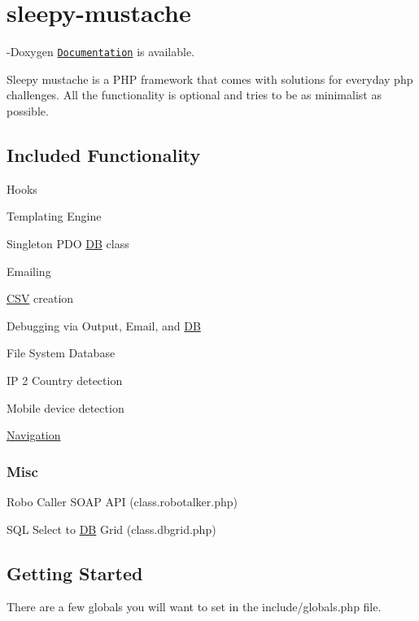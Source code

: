 \section*{sleepy-\/mustache}

-\/\-Doxygen \href{http://www.sleepymustache.com/documentation/html/index.html}{\tt Documentation} is available.

Sleepy mustache is a P\-H\-P framework that comes with solutions for everyday php challenges. All the functionality is optional and tries to be as minimalist as possible.

\subsection*{Included Functionality}


\begin{DoxyItemize}
\item Hooks
\item Templating Engine
\item Singleton P\-D\-O \hyperlink{class_d_b}{D\-B} class
\item Emailing
\item \hyperlink{class_c_s_v}{C\-S\-V} creation
\item Debugging via Output, Email, and \hyperlink{class_d_b}{D\-B}
\item File System Database
\item I\-P 2 Country detection
\item Mobile device detection
\item \hyperlink{class_navigation}{Navigation}
\end{DoxyItemize}

\subsubsection*{Misc}


\begin{DoxyItemize}
\item Robo Caller S\-O\-A\-P A\-P\-I (class.\-robotalker.\-php)
\item S\-Q\-L Select to \hyperlink{class_d_b}{D\-B} Grid (class.\-dbgrid.\-php)
\end{DoxyItemize}

\subsection*{Getting Started}

There are a few globals you will want to set in the include/globals.\-php file.


